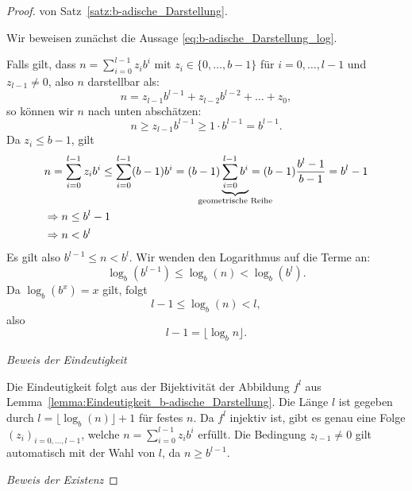 \documentclass{article}
\begin{document}
    \begin{proof} von Satz~\ref{satz:b-adische_Darstellung}. 

      Wir beweisen zunächst die Aussage \eqref{eq:b-adische_Darstellung_log}. 

      Falls gilt, dass $n=\sum_{i=0}^{l-1} z_i b^i$ mit $z_i \in \{0, \dots, b-1\}$ für $i = 0, \dots, l-1$ und $z_{l-1} \neq 0$, also $n$ darstellbar als:
      \begin{equation*}
        n = z_{l-1}b^{l-1} + z_{l-2}b^{l-2} + \dots + z_0,
      \end{equation*}
      so können wir $n$ nach unten abschätzen:
      \begin{equation*}
        n \geq z_{l-1}b^{l-1} \geq 1 \cdot b^{l-1} = b^{l-1}.
      \end{equation*}
      Da $z_i \leq b-1$, gilt
      \begin{align*}
        &n = \sum_{i=0}^{l-1} z_ib^i \leq \sum_{i=0}^{l-1} (b-1)b^i = (b-1) \underbrace{\sum_{i=0}^{l-1} b^i}_{\mathclap{\text{geometrische Reihe}}} = (b-1) \frac{b^l-1}{b-1} = b^l-1 \\
        &\Rightarrow n \leq b^l -1 \\
        &\Rightarrow n < b^l
      \end{align*}
      Es gilt also $b^{l-1} \leq n < b^l$. Wir wenden den Logarithmus auf die Terme an: 
      \begin{equation*}
        \log_b(b^{l-1}) \leq \log_b(n) < \log_b(b^l).
      \end{equation*}
      Da $\log_b(b^x) = x$ gilt, folgt
      \begin{equation*}
        l-1 \leq \log_b(n) < l,
      \end{equation*}
      also 
      \begin{equation*}
        l-1 = \lfloor \log_b n \rfloor.
      \end{equation*}

      \textit{Beweis der Eindeutigkeit} 

      Die Eindeutigkeit folgt aus der Bijektivität der Abbildung $f^l$ aus Lemma~\ref{lemma:Eindeutigkeit_b-adische_Darstellung}.
      Die Länge $l$ ist gegeben durch $l= \lfloor \log_b(n) \rfloor +1$ für festes $n$. 
      Da $f^l$ injektiv ist, gibt es genau eine Folge $(z_i)_{i=0,\dots,l-1}$, welche $n=\sum_{i=0}^{l-1} z_ib^i$ erfüllt.
      Die Bedingung $z_{l-1} \neq 0$ gilt automatisch mit der Wahl von $l$, da $n \geq b^{l-1}$.

      \textit{Beweis der Existenz} 


\end{proof}
\end{document}
